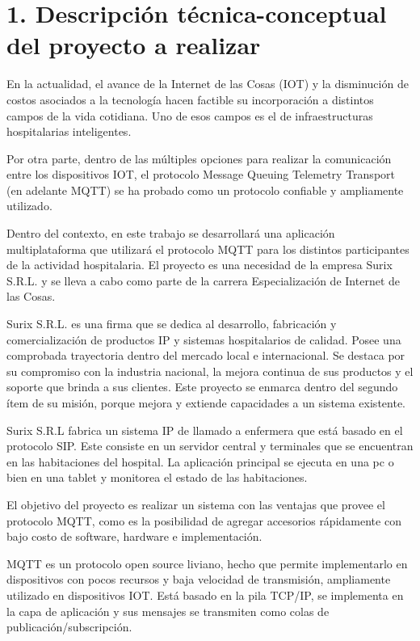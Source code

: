 \documentclass[
11pt, %
]{charter}
\begin{document}
\section{1. Descripción técnica-conceptual del proyecto a realizar}
\label{sec:descripcion}


En la actualidad, el avance de la Internet de las Cosas (IOT) y la disminución de costos asociados a la tecnología hacen factible su incorporación a distintos campos de la vida cotidiana. Uno de esos campos es el de infraestructuras hospitalarias inteligentes. 

Por otra parte, dentro de las múltiples opciones para realizar la comunicación entre los dispositivos IOT, el protocolo Message Queuing Telemetry Transport (en adelante MQTT) se ha probado como un protocolo confiable y ampliamente utilizado.

Dentro del contexto, en este trabajo se desarrollará una aplicación multiplataforma que utilizará el protocolo MQTT para los distintos participantes  de la actividad hospitalaria. El proyecto es una necesidad de la empresa Surix S.R.L. y se lleva a cabo como parte de la carrera Especialización de Internet de las Cosas.

Surix S.R.L. es una firma que se dedica al desarrollo, fabricación y comercialización de productos IP y sistemas hospitalarios de calidad. Posee una comprobada trayectoria dentro del mercado local e internacional. Se destaca por su compromiso con la industria nacional, la mejora continua de sus productos y el soporte que brinda a sus clientes. Este proyecto se enmarca dentro del segundo ítem de su misión, porque mejora y extiende capacidades a un sistema existente. 

Surix S.R.L fabrica un sistema IP de llamado a enfermera que está basado en el protocolo SIP. Este consiste en un servidor central y terminales que se encuentran en las habitaciones del hospital. La aplicación principal se ejecuta en una pc o bien en una tablet y monitorea el estado de las habitaciones. 
 
El objetivo del proyecto es realizar un sistema con las ventajas que provee el protocolo MQTT, como es la posibilidad de agregar accesorios rápidamente con bajo costo de software, hardware e implementación. 

MQTT es un protocolo open source liviano, hecho que permite implementarlo en dispositivos con pocos recursos y baja velocidad de transmisión, ampliamente utilizado en dispositivos IOT. Está basado en la pila TCP/IP, se implementa en la capa de aplicación y sus mensajes se transmiten como colas de publicación/subscripción. 
\end{document}
